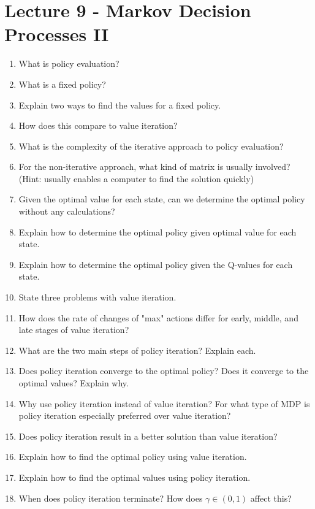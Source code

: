\documentclass[]{article}
\begin{document}
\section*{Lecture 9 - Markov Decision Processes II}
\begin{enumerate}
\item What is policy evaluation?
\item What is a fixed policy?
\item Explain two ways to find the values for a fixed policy.
\item How does this compare to value iteration?
\item What is the complexity of the iterative approach to policy evaluation?
\item For the non-iterative approach, what kind of matrix is usually involved? (Hint: usually enables a computer to find the solution quickly) \\

\item Given the optimal value for each state, can we determine the optimal policy without any calculations?
\item Explain how to determine the optimal policy given optimal value for each state.
\item Explain how to determine the optimal policy given the Q-values for each state. \\

\item State three problems with value iteration.
\item How does the rate of changes of "max" actions differ for early, middle, and late stages of value iteration?

\item What are the two main steps of policy iteration? Explain each.
\item Does policy iteration converge to the optimal policy? Does it converge to the optimal values? Explain why.
\item Why use policy iteration instead of value iteration? For what type of MDP is policy iteration especially preferred over value iteration?
\item Does policy iteration result in a better solution than value iteration?
\item Explain how to find the optimal policy using value iteration.
\item Explain how to find the optimal values using policy iteration.
\item When does policy iteration terminate? How does $\gamma \in (0,1)$ affect this?


\end{enumerate}
\end{document}
